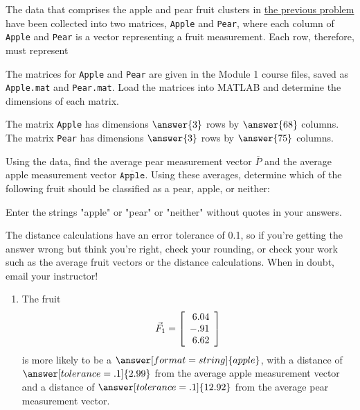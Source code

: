\documentclass{ximera}
\author{Zack Reed}
\begin{document}
\begin{problem}

The data that comprises the apple and pear fruit clusters in \href{https://ximera.osu.edu/appliedlinearalgebra/c1ChapterOne/Exercises/c1Homework/apple_pear_vect}{the previous problem} have been collected into two matrices, \texttt{Apple} and \texttt{Pear}, where each column of \texttt{Apple} and \texttt{Pear} is a vector representing a fruit measurement. Each row, therefore, must represent

\begin{multipleChoice}
\end{multipleChoice}

The matrices for \texttt{Apple} and \texttt{Pear} are given in the Module 1 course files, saved as \texttt{Apple.mat} and \texttt{Pear.mat}. Load the matrices into MATLAB and determine the dimensions of each matrix.

The matrix \texttt{Apple} has dimensions $\answer{3}$ rows by $\answer{68}$ columns. The matrix \texttt{Pear} has dimensions $\answer{3}$ rows by $\answer{75}$ columns.

Using the data, find the average pear measurement vector $\overline{P}$ and the average apple measurement vector $\overline{\texttt{Apple}}$. Using these averages, determine which of the following fruit should be classified as a pear, apple, or neither:

\begin{hint}
  Enter the strings "apple" or "pear" or "neither" without quotes in your answers.
  
  The distance calculations have an error tolerance of 0.1, so if you're getting the answer wrong but think you're right, check your rounding, or check your work such as the average fruit vectors or the distance calculations. When in doubt, email your instructor!
\end{hint}

\begin{enumerate}
\item
The fruit
\begin{equation*}
  \vec{F}_1=\startmat{r}
    6.04 \\
    -.91 \\
    6.62
  \stopmat
\end{equation*}
is more likely to be a $\answer[format=string]{apple}$, with a distance of $\answer[tolerance=.1]{2.99}$ from the average apple measurement vector and a distance of $\answer[tolerance=.1]{12.92}$ from the average pear measurement vector.


\end{enumerate}
\end{problem}
\end{document}
